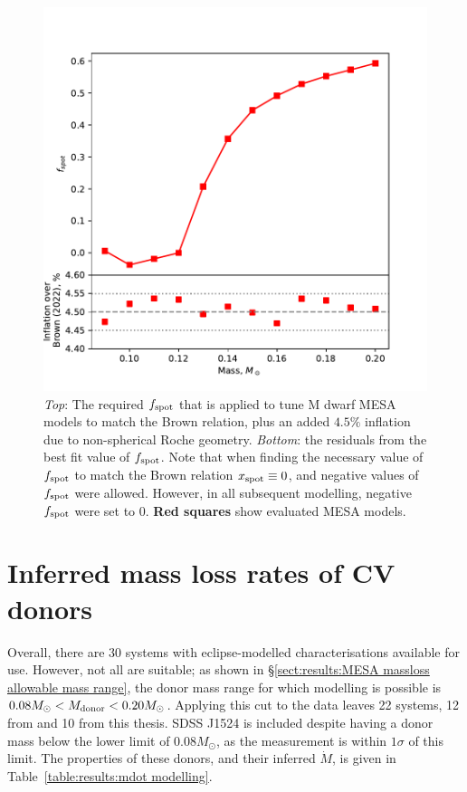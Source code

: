 \begin{figure}
    \centering
    \includegraphics[width=\textwidth]{figures/modelling/fspot_relation_to_match_brown_plus_4.5.pdf}
    \caption{{\it Top}: The required $f_{\rm spot}$ that is applied to tune M dwarf MESA models to match the Brown relation, plus an added $4.5\%$ inflation due to non-spherical Roche geometry. {\it Bottom}: the residuals from the best fit value of $f_{\rm spot}$. Note that when finding the necessary value of $f_{\rm spot}$ to match the Brown relation $x_{\rm spot} \equiv 0$, and negative values of $f_{\rm spot}$ were allowed. However, in all subsequent modelling, negative $f_{\rm spot}$ were set to 0. {\bf Red squares} show evaluated MESA models.}
    \label{fig:modelling:fspot mass relationship}
\end{figure}



\section{Inferred mass loss rates of CV donors}
\label{sect:modelling:donor mass loss rates}

Overall, there are 30 systems with eclipse-modelled characterisations available for use.
However, not all are suitable; as shown in \S\ref{sect:results:MESA massloss allowable mass range}, the donor mass range for which modelling is possible is $0.08 M_\odot < M_{\rm donor} < 0.20 M_\odot$.
Applying this cut to the data leaves 22 systems, 12 from \citet{McAllister2019} and 10 from this thesis.
SDSS J1524 is included despite having a donor mass below the lower limit of $0.08 M_\odot$, as the measurement is within $1\sigma$ of this limit.
The properties of these donors, and their inferred $\dot M$, is given in Table~\ref{table:results:mdot modelling}.

